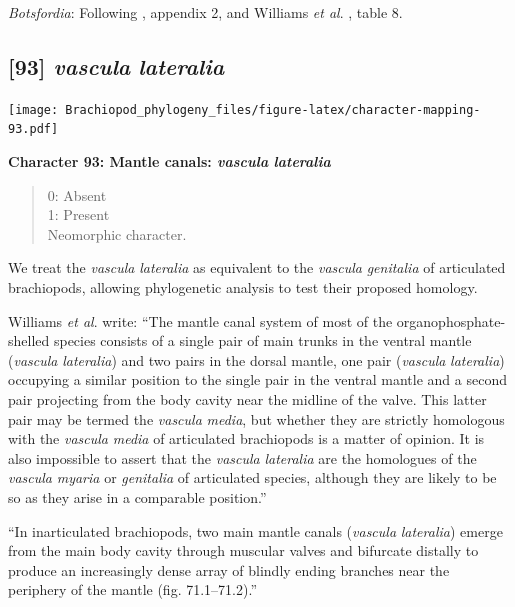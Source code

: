 \documentclass[]{book}
\theoremstyle{definition}
\theoremstyle{definition}
\theoremstyle{definition}
\theoremstyle{remark}
\begin{document}
\emph{Botsfordia}: Following \citet{Williams1998Thediversity}, appendix
2, and Williams \emph{et al}.
\citeyearpar{Williams2000BrachiopodaLinguliformea}, table 8.

\hypertarget{vascula-lateralia}{%
\subsection*{\texorpdfstring{{[}93{]} \emph{vascula}
\emph{lateralia}}{{[}93{]} vascula lateralia}}\label{vascula-lateralia}}

\texttt{[image: Brachiopod\_phylogeny\_files/figure-latex/character-mapping-93.pdf]}

\textbf{Character 93: Mantle canals: \emph{vascula} \emph{lateralia}}

\begin{quote}
0: Absent\\
1: Present\\
Neomorphic character.
\end{quote}

We treat the \emph{vascula} \emph{lateralia} as equivalent to the
\emph{vascula} \emph{genitalia} of articulated brachiopods, allowing
phylogenetic analysis to test their proposed homology.

Williams \emph{et al}. \citeyearpar{Williams1997BrachiopodaRevised}
write: ``The mantle canal system of most of the organophosphate-shelled
species consists of a single pair of main trunks in the ventral mantle
(\emph{vascula} \emph{lateralia}) and two pairs in the dorsal mantle,
one pair (\emph{vascula} \emph{lateralia}) occupying a similar position
to the single pair in the ventral mantle and a second pair projecting
from the body cavity near the midline of the valve. This latter pair may
be termed the \emph{vascula} \emph{media}, but whether they are strictly
homologous with the \emph{vascula} \emph{media} of articulated
brachiopods is a matter of opinion. It is also impossible to assert that
the \emph{vascula} \emph{lateralia} are the homologues of the
\emph{vascula} \emph{myaria} or \emph{genitalia} of articulated species,
although they are likely to be so as they arise in a comparable
position.''

``In inarticulated brachiopods, two main mantle canals (\emph{vascula}
\emph{lateralia}) emerge from the main body cavity through muscular
valves and bifurcate distally to produce an increasingly dense array of
blindly ending branches near the periphery of the mantle (fig.
71.1--71.2).''
\end{document}
